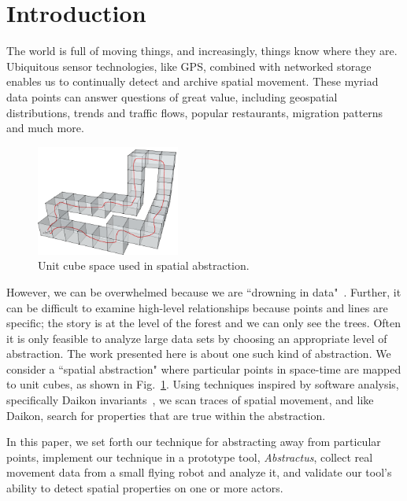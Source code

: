 \section{Introduction}

The world is full of moving things, and increasingly, things know where they are. 
Ubiquitous sensor technologies, like GPS, combined with networked storage enables us to continually detect and archive spatial movement.
These myriad data points can answer questions of great value, including geospatial distributions, trends and traffic flows, popular restaurants, migration patterns and much more.

\begin{figure}
  \centering
  \includegraphics[width=0.42\textwidth]{./figures/path_overview}
  \caption{Unit cube space used in spatial abstraction.}
  \label{fig:unitCubes}
\end{figure}

However, we can be overwhelmed because we are ``drowning in data"~\cite{morse1993drowning}.
Further, it can be difficult to examine high-level relationships because points and lines are specific; the story is at the level of the forest and we can only see the trees.  
Often it is only feasible to analyze large data sets by choosing an appropriate level of abstraction.
The work presented here is about one such kind of abstraction.
We consider a ``spatial abstraction" where particular points in space-time are mapped to unit cubes, as shown in Fig.~\ref{fig:unitCubes}.
Using techniques inspired by software analysis, specifically Daikon invariants~\cite{kataoka2001automated}, we scan traces of spatial movement, and like Daikon, search for properties that are true within the abstraction.  

In this paper, we set forth our technique for abstracting away from particular points, 
implement our technique in a prototype tool, \emph{Abstractus},
collect real movement data from a small flying robot and analyze it, 
and validate our tool's ability to detect spatial properties on one or more actors.

